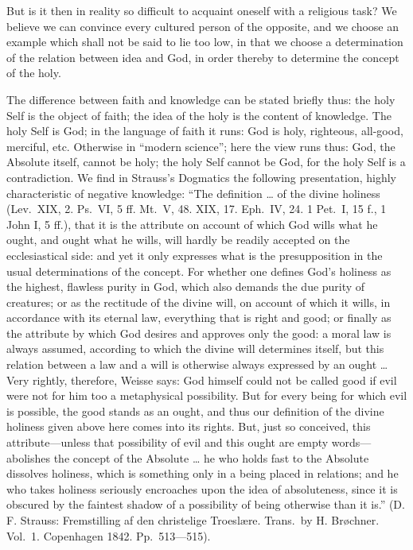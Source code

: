 \documentclass[12pt]{book}
\newcommand{\opage}[1]{\marginnote{\footnotesize\textit{[#1]}}}
\begin{document}
But is it then in reality so difficult to acquaint oneself with a
religious task? We believe we can convince every cultured person of the
opposite, and we choose an example which shall not be said to lie too
low, in that we choose a determination of the relation between idea and
God, in order thereby to determine the concept of the holy.

The difference between faith and knowledge can be stated briefly thus:
the holy Self is the object of faith; the idea of the holy is the
content of knowledge. The holy Self is God; in the language of faith it
runs: God is holy, righteous, all-good, merciful, etc. Otherwise in
``modern science''; here the view runs thus:
God, the Absolute itself, cannot be holy; the holy Self cannot be God,
for the holy Self is a contradiction. We find in Strauss's Dogmatics the
following presentation, highly characteristic of negative knowledge:
\opage{110}\setcounter{footnote}{0}%
``The definition \ldots{} of the divine holiness (Lev.\ XIX, 2. Ps.\ VI,
5 ff. Mt.\ V, 48. XIX, 17. Eph.\ IV, 24. 1 Pet.\ I, 15 f., 1 John I,
5 ff.), that it is the attribute on account of which God wills what he
ought, and ought what he wills, will hardly be readily accepted on the
ecclesiastical side: and yet it only expresses what is the presupposition
in the usual determinations of the concept. For whether one defines
God's holiness as the highest, flawless purity in God, which also
demands the due purity of creatures; or as the rectitude of the divine
will, on account of which it wills, in accordance with its eternal law,
everything that is right and good; or finally as the attribute by which
God desires and approves only the good: a moral law is always assumed,
according to which the divine will determines itself, but this relation
between a law and a will is otherwise always expressed by an
ought \ldots{} Very rightly, therefore, Weisse says: God himself could not
be called good if evil were not for him too a metaphysical possibility.
But for every being for which evil is possible, the good stands as an
ought, and thus our definition of the divine holiness given above here
comes into its rights. But, just so conceived, this attribute---unless
that possibility of evil and this ought are empty words---abolishes the
concept of the Absolute \ldots{} he who holds fast to the Absolute
dissolves holiness, which is something only in a being placed in
relations; and he who takes holiness seriously encroaches upon the idea
of absoluteness, since it is obscured by the faintest shadow of a
possibility of being otherwise than it is.'' (D. F. Strauss:
Fremstilling
\opage{111}\setcounter{footnote}{0}%
af den christelige Troeslære. Trans.\ by H. Brøchner. Vol.~1.
Copenhagen 1842. Pp.\ 513---515).
\end{document}

